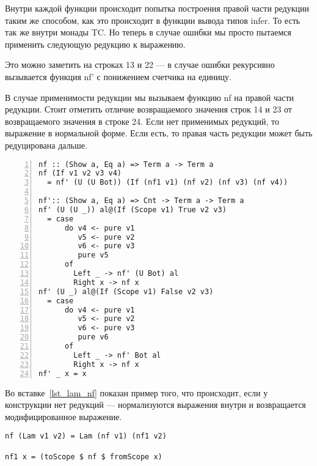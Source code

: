 Внутри каждой функции происходит попытка построения правой части редукции таким же способом, как это происходит в функции вывода типов infer. То есть так же внутри монады TC. Но теперь в случае ошибки мы просто пытаемся применить следующую редукцию к выражению.

Это можно заметить на строках 13 и 22 --- в случае ошибки рекурсивно вызывается функция nf' с понижением счетчика на единицу.

В случае применимости редукции мы вызываем функцию nf на правой части редукции. Стоит отметить отличие возвращаемого значения строк 14 и 23 от возвращаемого значения в строке 24. Если нет применимых редукций, то выражение в нормальной форме. Если есть, то правая часть редукции может быть редуцирована дальше.

\begin{lstlisting}[caption={Приведение в нормальную форму пытается применить все редукции данного функционального символа},captionpos=b, frame=single, float, floatplacement=H, label={lst_if_nf}, numbers=left]
nf :: (Show a, Eq a) => Term a -> Term a
nf (If v1 v2 v3 v4)
  = nf' (U (U Bot)) (If (nf1 v1) (nf v2) (nf v3) (nf v4))

nf':: (Show a, Eq a) => Cnt -> Term a -> Term a
nf' (U (U _)) al@(If (Scope v1) True v2 v3)
  = case
      do v4 <- pure v1
         v5 <- pure v2
         v6 <- pure v3
         pure v5
      of
        Left _ -> nf' (U Bot) al
        Right x -> nf x
nf' (U _) al@(If (Scope v1) False v2 v3)
  = case
      do v4 <- pure v1
         v5 <- pure v2
         v6 <- pure v3
         pure v6
      of
        Left _ -> nf' Bot al
        Right x -> nf x
nf' _ x = x
\end{lstlisting}

Во вставке~\ref{lst_lam_nf} показан пример того, что происходит, если  у конструкции нет редукций --- нормализуются выражения внутри и возвращается модифицированное выражение.

\begin{lstlisting}[caption={Приведение в нормальную форму конструкции, у которой нет редукций}, captionpos=b, frame=single, float, floatplacement=H, label={lst_lam_nf}]
nf (Lam v1 v2) = Lam (nf v1) (nf1 v2)

nf1 x = (toScope $ nf $ fromScope x)
\end{lstlisting}
